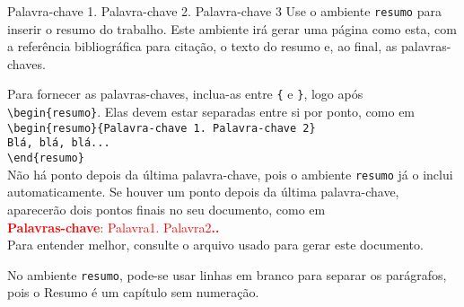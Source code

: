 \documentclass[qualimst]{eesc-stt}
\begin{document}


\begin{resumo}{Palavra-chave 1. Palavra-chave 2. Palavra-chave 3}
     Use o ambiente \texttt{resumo} para inserir o resumo do trabalho. Este
 	 ambiente irá gerar uma página como esta, com a referência bibliográfica
 	 para citação, o texto do resumo e, ao final, as palavras-chaves.
 	 
 	 Para fornecer as palavras-chaves, inclua-as entre \texttt{\{} e \texttt{\}},
 	 logo após \verb|\begin{resumo}|.  Elas devem estar 
 	 separadas entre si por ponto, como em \\
 	 \hspace*{1em}\verb|\begin{resumo}{Palavra-chave 1. Palavra-chave 2}|\\
 	 \hspace*{2em}\verb|Blá, blá, blá...|\\
 	 \hspace*{1em}\verb|\end{resumo}|\\
 	 Não há ponto depois da última palavra-chave, pois o ambiente 
 	 \texttt{resumo} já o inclui automaticamente. Se houver um ponto depois
 	 da última palavra-chave, aparecerão dois pontos finais no seu documento,
 	 como em\\
 	 \hspace*{5em}\textcolor{red}{\textsf{\textbf{Palavras-chave}: Palavra1. Palavra2\textbf{..}}}\\ 
 	 Para entender melhor, consulte o arquivo usado para gerar este documento.
 	 
 	 No ambiente  \texttt{resumo}, pode-se usar linhas em branco para separar os parágrafos,
 	 pois o Resumo é um capítulo sem numeração. \vspace{-12pt}

\end{resumo}
\end{document}
